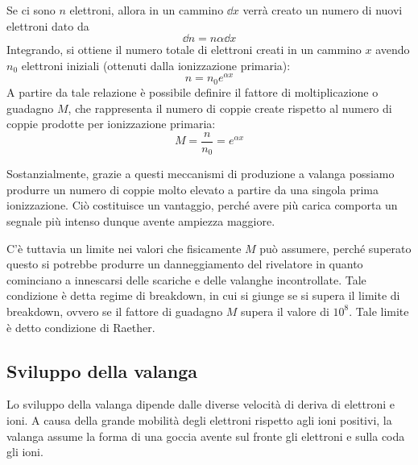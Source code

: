 Se ci sono $n$ elettroni, allora in un cammino $\dd{x}$ verrà creato un numero di nuovi elettroni dato da
\begin{equation*}
   \dd{n}=n\alpha\dd{x}
\end{equation*}
Integrando, si ottiene il numero totale di elettroni creati in un cammino $x$ avendo $n_0$ elettroni iniziali (ottenuti dalla ionizzazione primaria):
\begin{equation*}
   n=n_0e^{\alpha x}
\end{equation*}
A partire da tale relazione è possibile definire il fattore di moltiplicazione o guadagno $M$, che rappresenta il numero di coppie create rispetto al numero di coppie prodotte per ionizzazione primaria:
\begin{equation*}
   M=\frac{n}{n_0}=e^{\alpha x}
\end{equation*}

Sostanzialmente, grazie a questi meccanismi di produzione a valanga possiamo produrre un numero di coppie molto elevato a partire da una singola prima ionizzazione. Ciò costituisce un vantaggio, perché avere più carica comporta un segnale più intenso dunque avente ampiezza maggiore.

C'è tuttavia un limite nei valori che fisicamente $M$ può assumere, perché superato questo si potrebbe produrre un danneggiamento del rivelatore in quanto cominciano a innescarsi delle scariche e delle valanghe incontrollate. Tale condizione è detta regime di breakdown, in cui si giunge se si supera il limite di breakdown, ovvero se il fattore di guadagno $M$ supera il valore di $10^8$. Tale limite è detto condizione di Raether.

\subsection{Sviluppo della valanga}

Lo sviluppo della valanga dipende dalle diverse velocità di deriva di elettroni e ioni. A causa della grande mobilità degli elettroni rispetto agli ioni positivi, la valanga assume la forma di una goccia avente sul fronte gli elettroni e sulla coda gli ioni.


